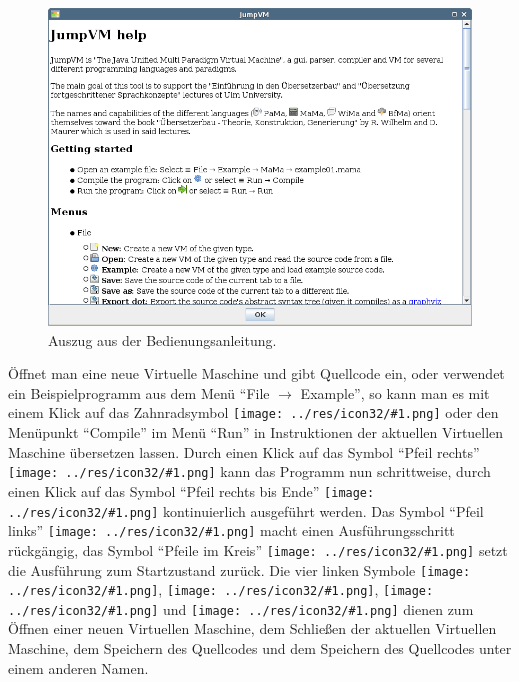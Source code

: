 \documentclass[german, a4paper, parskip, bibliography=totoc]{scrartcl}
\newcommand{\icon}[1]{\texttt{[image: ../res/icon32/\#1.png]}}
\begin{document}
\begin{figure}[htb]
    \centering
    \includegraphics[width=\textwidth]{screenshot_help.png}
    \caption{Auszug aus der Bedienungsanleitung.}
    \label{img_jumpvm_help}
\end{figure}

Öffnet man eine neue Virtuelle Maschine und gibt Quellcode ein, oder verwendet
ein Beispielprogramm aus dem Menü \enquote{File $\rightarrow$ Example}, so kann
man es mit einem Klick auf das Zahnradsymbol \icon{applications-system} oder
den Menüpunkt \enquote{Compile} im Menü \enquote{Run} in Instruktionen der
aktuellen Virtuellen Maschine übersetzen lassen. Durch einen Klick auf das
Symbol \enquote{Pfeil rechts} \icon{go-next} kann das Programm nun
schrittweise, durch einen Klick auf das Symbol \enquote{Pfeil rechts bis Ende}
\icon{go-last} kontinuierlich ausgeführt werden. Das Symbol \enquote{Pfeil
links} \icon{go-previous} macht einen Ausführungsschritt rückgängig, das Symbol
\enquote{Pfeile im Kreis} \icon{view-refresh} setzt die Ausführung zum
Startzustand zurück. Die vier linken Symbole \icon{document-new},
\icon{user-trash}, \icon{document-save} und \icon{document-save-as} dienen zum
Öffnen einer neuen Virtuellen Maschine, dem Schließen der aktuellen Virtuellen
Maschine, dem Speichern des Quellcodes und dem Speichern des Quellcodes unter
einem anderen Namen.
\end{document}
